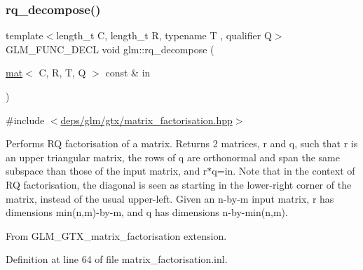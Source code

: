 \subsubsection{\texorpdfstring{rq\+\_\+decompose()}{rq\_decompose()}}
{\footnotesize\ttfamily template$<$length\+\_\+t C, length\+\_\+t R, typename T , qualifier Q$>$ \\
G\+L\+M\+\_\+\+F\+U\+N\+C\+\_\+\+D\+E\+CL void glm\+::rq\+\_\+decompose (\begin{DoxyParamCaption}\item[{\hyperlink{structglm_1_1mat}{mat}$<$ C, R, T, Q $>$ const \&}]{in }\end{DoxyParamCaption})}



{\ttfamily \#include $<$\hyperlink{matrix__factorisation_8hpp}{deps/glm/gtx/matrix\+\_\+factorisation.\+hpp}$>$}

Performs RQ factorisation of a matrix. Returns 2 matrices, r and q, such that r is an upper triangular matrix, the rows of q are orthonormal and span the same subspace than those of the input matrix, and r$\ast$q=in. Note that in the context of RQ factorisation, the diagonal is seen as starting in the lower-\/right corner of the matrix, instead of the usual upper-\/left. Given an n-\/by-\/m input matrix, r has dimensions min(n,m)-\/by-\/m, and q has dimensions n-\/by-\/min(n,m).

From G\+L\+M\+\_\+\+G\+T\+X\+\_\+matrix\+\_\+factorisation extension. 

Definition at line 64 of file matrix\+\_\+factorisation.\+inl.

